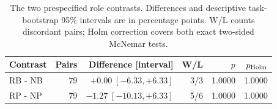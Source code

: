 \begin{table}[t]\centering\small
\caption{The two prespecified role contrasts. Differences and descriptive task-bootstrap 95\% intervals are in percentage points. W/L counts discordant pairs; Holm correction covers both exact two-sided McNemar tests.}\label{tab:seg80-tests}
\begin{tabular*}{\linewidth}{@{\extracolsep{\fill}}lrrrrr}\toprule
Contrast & Pairs & Difference [interval] & W/L & $p$ & $p_{\rm Holm}$\\
\midrule
RB - NB & 79 & $+0.00\;[-6.33,+6.33]$ & 3/3 & 1.0000 & 1.0000\\
RP - NP & 79 & $-1.27\;[-10.13,+6.33]$ & 5/6 & 1.0000 & 1.0000\\
\bottomrule\end{tabular*}\end{table}
